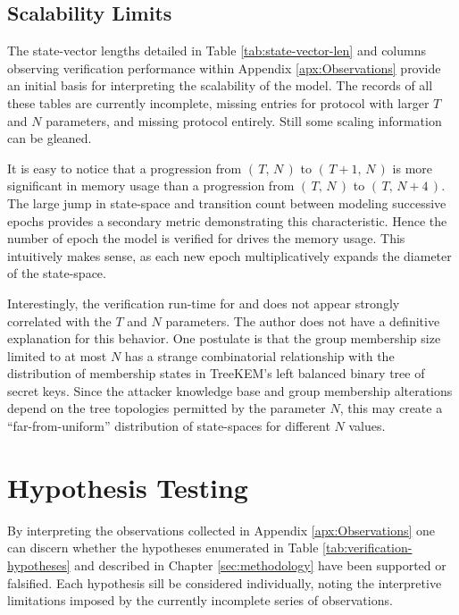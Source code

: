 \hypertarget{scalability-limits}{%
\subsection{Scalability Limits}\label{scalability-limits}}

The state-vector lengths detailed in Table \ref{tab:state-vector-len} and columns observing verification performance within Appendix \ref{apx:Observations} provide an initial basis for interpreting the scalability of the  model.
The records of all these tables are currently incomplete, missing entries for protocol \VersionOne with larger \(T\) and \(N\) parameters, and missing protocol \VersionTwo entirely.
Still some scaling information can be gleaned.

It is easy to notice that a progression from \( (\,T,\, N\,) \) to \( (\,T+1,\, N\,) \) is more significant in memory usage than a progression from \( (\,T,\, N\,) \) to \( (\,T,\, N+4\,) \).
The large jump in state-space and transition count between modeling successive epochs provides a secondary metric demonstrating this characteristic.
Hence the number of epoch the model is verified for drives the memory usage.
This intuitively makes sense, as each new epoch multiplicatively expands the diameter of the state-space.

Interestingly, the verification run-time for  and  does not appear strongly correlated with the \(T\) and \(N\) parameters.
The author does not have a definitive explanation for this behavior.
One postulate is that the group membership size limited to at most \(N\) has a strange combinatorial relationship with the distribution of membership states in TreeKEM's left balanced binary tree of secret keys.
Since the attacker knowledge base and group membership alterations depend on the tree topologies permitted by the parameter \(N\), this may create a ``far-from-uniform'' distribution of state-spaces for different \(N\) values.


\hypertarget{sec:hypothesis-outcomes}{%
\section{Hypothesis Testing}\label{sec:hypothesis-outcomes}}

By interpreting the observations collected in Appendix \ref{apx:Observations} one can discern whether the hypotheses enumerated in Table \ref{tab:verification-hypotheses} and described in Chapter \ref{sec:methodology} have been supported or falsified.
Each hypothesis sill be considered individually, noting the interpretive limitations imposed by the currently incomplete series of observations.


